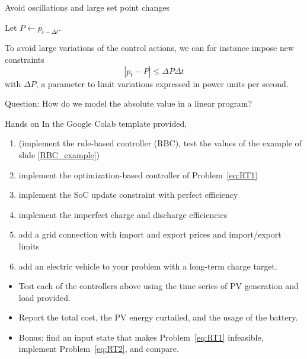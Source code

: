 \begin{frame} {Avoid oscillations and large set point changes} 

    Let $P \leftarrow p_{t-\Delta t}$.
    
    To avoid large variations of the control actions, we can for instance impose new constraints 
    $$| p_t - P| \leq \Delta P \Delta t$$
    with $\Delta P$, a parameter to limit variations expressed in power units per second.

    Question: How do we model the absolute value in a linear program?
\end{frame}


\begin{frame}[allowframebreaks]{Hands on}
    In the Google Colab template provided, 
    \begin{enumerate}
        \item (implement the rule-based controller (RBC), test the values of the example of slide \ref{RBC_example})
        \item implement the optimization-based controller of Problem~\eqref{eq:RT1}
        \item implement the SoC update constraint with perfect efficiency
        \item implement the imperfect charge and discharge efficiencies
        \item add a grid connection with import and export prices and import/export limits
        \item add an electric vehicle to your problem with a long-term charge target.
    \end{enumerate}
    \begin{itemize}
        \item Test each of the controllers above using the time series of PV generation and load provided.
        \item Report the total cost, the PV energy curtailed, and the usage of the battery.
        \item Bonus: find an input state that makes Problem~\eqref{eq:RT1} infeasible, implement Problem~\eqref{eq:RT2}, and compare.
    \end{itemize}
    
\end{frame}
